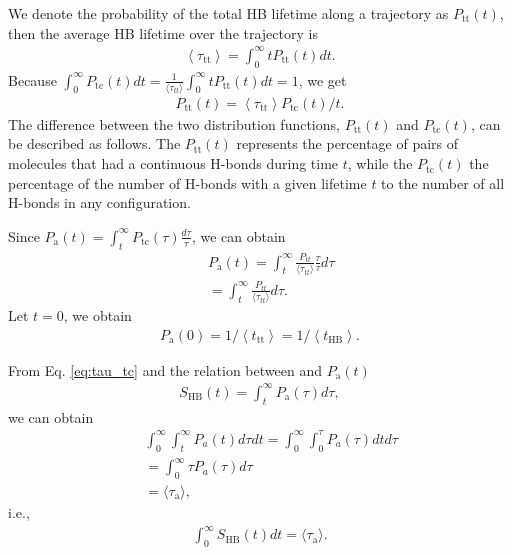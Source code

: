 {We denote the probability of the total HB lifetime along a trajectory as $P_{\mathrm{tt}}(t)$,
then the average HB lifetime over the trajectory is
\begin{eqnarray}
\left\langle\tau_{\mathrm{tt}}\right\rangle=\int_{0}^{\infty} t P_{\mathrm{tt}}(t) d t.
\label{eq:relation_tau_tt}
\end{eqnarray}
Because $\int_{0}^{\infty} P_{\mathrm{tc}}(t) d t=\frac{1}{\langle \tau_{tt}\rangle} \int_{0}^{\infty} t P_{\mathrm{tt}}(t) d t = 1$, 
we get 
\begin{eqnarray}
P_{\mathrm{tt}}(t)=\left\langle \tau_{\mathrm{tt}}\right\rangle P_{\mathrm{tc}}(t) / t.
\label{eq:relation_P_tt--P_tc}
\end{eqnarray}
The difference between the two distribution functions, $P_{\mathrm{tt}}(t)$ and $P_{\mathrm{tc}}(t)$, can be described as follows.
The $P_{\mathrm{tt}}(t)$ represents the percentage of pairs of molecules that had a continuous H-bonds during time $t$, 
while the $P_{\mathrm{tc}}(t)$ the percentage of the number of H-bonds with a given lifetime $t$ to the number of all H-bonds in any configuration. 
\cite{Voloshin2009}

Since $P_{\mathrm{a}}(t)=\int_{t}^{\infty} P_{\mathrm{tc}}(\tau) \frac{d \tau}{\tau}$,
we can obtain
\begin{eqnarray}
&& P_{\mathrm{a}}(t)=\int_t^\infty \frac{P_{tt}}{\langle\tau_{tt}\rangle} \frac{\tau}{\tau} d\tau \nonumber \\
&& =  \int_t^\infty \frac{P_{tt}}{\langle\tau_{tt}\rangle}d\tau. \nonumber
\label{eq:P_a}
\end{eqnarray}
Let $t=0$, we obtain
\begin{eqnarray}
P_{\mathrm{a}}(0)=1 /\left\langle t_{\mathrm{tt}}\right\rangle = 1 /\left\langle t_{\mathrm{HB}}\right\rangle.
\label{eq:P_a0}
\end{eqnarray}

From Eq. \ref{eq:tau_tc} and the relation between \SHB and $P_{\mathrm{a}}(t)$
\begin{eqnarray}
S_{\mathrm{HB}}(t)=\int_{t}^{\infty} P_{\mathrm{a}}(\tau) d \tau,
\label{eq:P_a}
\end{eqnarray}
we can obtain
%
\begin{eqnarray}
&&\int_{0}^{\infty} \int_{t}^{\infty} P_{a}(t) d \tau d t = \int_{0}^{\infty} \int_{0}^{\tau} P_{a}(\tau) d t d \tau \nonumber \\
&& = \int_{0}^{\infty} \tau P_{a}(\tau) d \tau \nonumber \\
&& = \langle \tau_{\mathrm{a}} \rangle, \nonumber
\end{eqnarray}
i.e., 
\begin{eqnarray}
\int_{0}^{\infty}  S_{\mathrm{HB}}(t) d t = \langle \tau_{\mathrm{a}} \rangle.
\label{eq:int_Ca}
\end{eqnarray}
}
